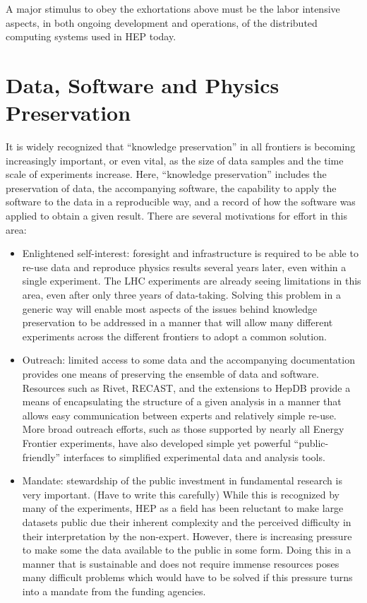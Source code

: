 A major stimulus to obey the exhortations above must be the labor intensive aspects, in both ongoing development and operations, of the distributed computing systems used in HEP today.

\section{Data, Software and Physics Preservation}
It is widely recognized that “knowledge preservation” in all frontiers is becoming increasingly important, or even vital, as the size of data samples and the time scale of experiments increase.  Here, “knowledge preservation” includes the preservation of data, the accompanying software, the capability to apply the software to the data in a reproducible way, and a record of how the software was applied to obtain a given result.  There are several motivations for effort in this area:
\begin{itemize}
\item
Enlightened self-interest: foresight and infrastructure is required to be able to re-use data and reproduce physics results several years later, even within a single experiment.  The LHC experiments are already seeing limitations in this area, even after only three years of data-taking.  Solving this problem in a generic way will enable most aspects of the issues behind knowledge preservation to be addressed in a manner that will allow many different experiments across the different frontiers to adopt a common solution.
\item
Outreach: limited access to some data and the accompanying documentation provides one means of preserving the ensemble of data and software.  Resources such as Rivet, RECAST, and the extensions to HepDB provide a means of encapsulating the structure of a given analysis in a manner that allows easy communication between experts and relatively simple re-use.  More broad outreach efforts, such as those supported by nearly all Energy Frontier experiments, have also developed simple yet powerful “public-friendly” interfaces to simplified experimental data and analysis tools.
\item
Mandate: stewardship of the public investment in fundamental research is very important. (Have to write this carefully) While this is recognized by many of the experiments, HEP as a field has been reluctant to make large datasets public due their inherent complexity and the perceived difficulty in their interpretation by the non-expert.  However, there is increasing pressure to make some the data available to the public in some form.  Doing this in a manner that is sustainable and does not require immense resources poses many difficult problems which would have to be solved if this pressure turns into a mandate from the funding agencies.
\end{itemize}

